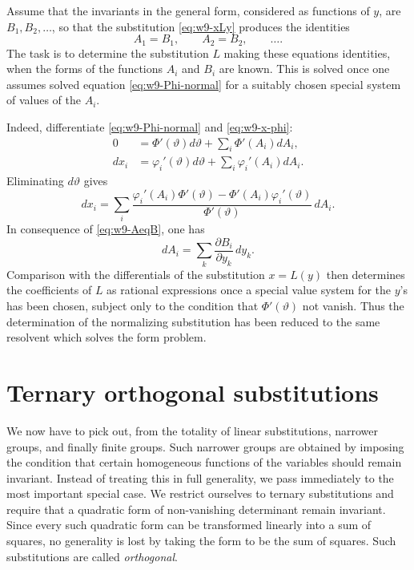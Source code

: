 \documentclass[11pt]{article}
\begin{document}
Assume that the invariants in the general form, considered as functions of $y$, are $B_1,B_2,\ldots$, so that the substitution \eqref{eq:w9-xLy} produces the identities
\begin{equation}\label{eq:w9-AeqB}
 A_1=B_1,
 \qquad A_2=B_2,
 \qquad \ldots .
\end{equation}
The task is to determine the substitution $L$ making these equations identities, when the forms of the functions $A_i$ and $B_i$ are known.  This is solved once one assumes solved equation \eqref{eq:w9-Phi-normal} for a suitably chosen special system of values of the $A_i$.

Indeed, differentiate \eqref{eq:w9-Phi-normal} and \eqref{eq:w9-x-phi}:
\begin{align*}
0&=\Phi'(\vartheta)d\vartheta+\sum_i\Phi'(A_i)dA_i,\\
dx_i&=\varphi_i'(\vartheta)d\vartheta+
       \sum_i\varphi_i'(A_i)dA_i.
\end{align*}
Eliminating $d\vartheta$ gives
\begin{equation}\label{eq:w9-dx}
 dx_i=
 \sum_i
 \frac{\varphi_i'(A_i)\Phi'(\vartheta)-\Phi'(A_i)\varphi_i'(\vartheta)}
      {\Phi'(\vartheta)}\,dA_i.
\end{equation}
In consequence of \eqref{eq:w9-AeqB}, one has
\begin{equation}\label{eq:w9-dA}
 dA_i=\sum_k\frac{\partial B_i}{\partial y_k}\,dy_k.
\end{equation}
Comparison with the differentials of the substitution $x=L(y)$ then determines the coefficients of $L$ as rational expressions once a special value system for the $y$'s has been chosen, subject only to the condition that $\Phi'(\vartheta)$ not vanish.  Thus the determination of the normalizing substitution has been reduced to the same resolvent which solves the form problem.

\section{Ternary orthogonal substitutions}

We now have to pick out, from the totality of linear substitutions, narrower groups, and finally finite groups.  Such narrower groups are obtained by imposing the condition that certain homogeneous functions of the variables should remain invariant.  Instead of treating this in full generality, we pass immediately to the most important special case.  We restrict ourselves to ternary substitutions and require that a quadratic form of non-vanishing determinant remain invariant.  Since every such quadratic form can be transformed linearly into a sum of squares, no generality is lost by taking the form to be the sum of squares.  Such substitutions are called \emph{orthogonal}.
\end{document}

